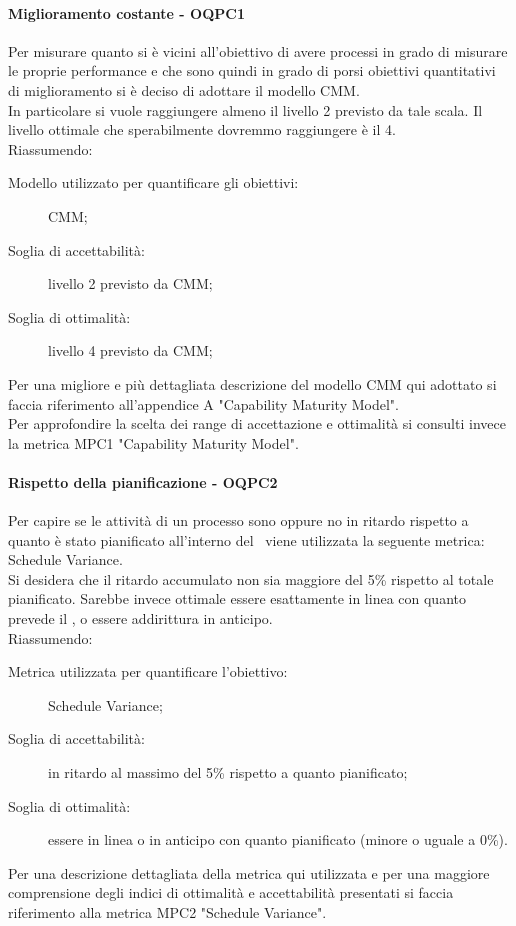 \documentclass[../PianoDiQualifica.tex]{subfiles}
\begin{document}
		\paragraph{Miglioramento costante - OQPC1}
		Per misurare quanto si è vicini all’obiettivo di avere processi in grado di misurare le proprie performance e che sono quindi in grado di porsi obiettivi quantitativi di miglioramento si è deciso di adottare il modello CMM.\\
		In particolare si vuole raggiungere almeno il livello 2 previsto da tale scala. Il livello ottimale che sperabilmente dovremmo raggiungere è il 4.\\
		Riassumendo:
		\begin{description}
			\item[Modello utilizzato per quantificare gli obiettivi:] CMM;
			\item[Soglia di accettabilità:] livello 2 previsto da CMM;
			\item[Soglia di ottimalità:] livello 4 previsto da CMM;
		\end{description}
		Per una migliore e più dettagliata descrizione del modello CMM qui adottato si faccia riferimento all'appendice A "Capability Maturity Model".\\
		Per approfondire la scelta dei range di accettazione e ottimalità si consulti invece la metrica MPC1 "Capability Maturity Model".
		
		\paragraph{Rispetto della pianificazione - OQPC2}
		Per capire se le attività di un processo sono oppure no in ritardo rispetto a quanto è stato pianificato all’interno del \pianodiprogetto\ viene utilizzata la seguente metrica: Schedule Variance.\\
		Si desidera che il ritardo accumulato non sia maggiore del 5\% rispetto al totale pianificato. Sarebbe invece ottimale essere esattamente in linea con quanto prevede il \pianodiprogetto, o essere addirittura in anticipo.\\
		Riassumendo:
		\begin{description}
			\item[Metrica utilizzata per quantificare l’obiettivo:] Schedule Variance;
			\item[Soglia di accettabilità:] in ritardo al massimo del 5\% rispetto a quanto pianificato;
			\item[Soglia di ottimalità:] essere in linea o in anticipo con quanto pianificato (minore o uguale a 0\%).
		\end{description}
		Per una descrizione dettagliata della metrica qui utilizzata e per una maggiore comprensione degli indici di ottimalità e accettabilità presentati si faccia riferimento alla metrica MPC2 "Schedule Variance".
		
\end{document}
